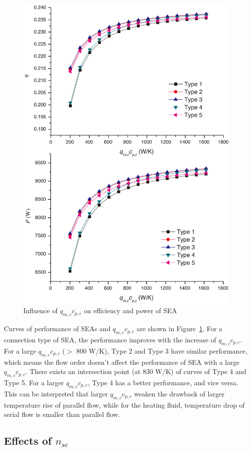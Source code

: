 \documentclass[review,3p,10t]{elsarticle}
\begin{document}
\noindent \begin{figure}[htbp]
\begin{center}
	\includegraphics[width = 0.7\columnwidth]{./graphics/qm_ccp_c}
	\caption{Influence of $q_{m,c}c_{p,c}$ on efficiency and power of SEA}
	\label{fig:qm_ccp_c}
\end{center}
\end{figure}

Curves of performance of SEAs and $q_{m,c}c_{p,c}$ are shown in Figure~\ref{fig:qm_ccp_c}. For a connection type of SEA, the performance improves with the increase of $q_{m,c}c_{p,c}$. For a large $q_{m,c}c_{p,c}$ ($>$ 800 W/K), Type 2 and Type 3 have similar performance, which means the flow order doesn't affect the performance of SEA with a large $q_{m,c}c_{p,c}$. There exists an intersection point (at 830 W/K) of curves of Type 4 and Type 5. For a larger $q_{m,c}c_{p,c}$, Type 4 has a better performance, and vice versa. This can be interpreted that larger $q_{m,c}c_{p,c}$ weaken the drawback of larger temperature rise of parallel flow, while for the heating fluid, temperature drop of serial flow is smaller than parallel flow.

\subsection{Effects of $n_{se}$}
\end{document}
